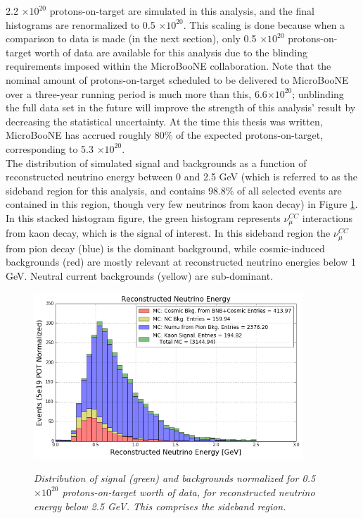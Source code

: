 2.2 $\times 10^{20}$ protons-on-target are simulated in this analysis, and the final histograms are renormalized to 0.5 $\times 10^{20}$. This scaling is done because when a comparison to data is made (in the next section), only 0.5 $\times 10^{20}$ protons-on-target worth of data are available for this analysis due to the blinding requirements imposed within the MicroBooNE collaboration. Note that the nominal amount of protons-on-target scheduled to be delivered to MicroBooNE over a three-year running period is much more than this, 6.6$\times 10^{20}$; unblinding the full data set in the future will improve the strength of this analysis' result by decreasing the statistical uncertainty. At the time this thesis was written, MicroBooNE has accrued roughly 80\% of the expected protons-on-target, corresponding to 5.3 $\times 10^{20}$.\\

The distribution of simulated signal and backgrounds as a function of reconstructed neutrino energy between 0 and 2.5 GeV (which is referred to as the sideband region for this analysis, and contains 98.8\% of all selected events are contained in this region, though very few neutrinos from kaon decay) in Figure \ref{kaon_stack_sideband_nodata}. In this stacked histogram figure, the green histogram represents $\nu_\mu^{CC}$ interactions from kaon decay, which is the signal of interest. In this sideband region the $\nu_\mu^{CC}$ from pion decay (blue) is the dominant background, while cosmic-induced backgrounds (red) are mostly relevant at reconstructed neutrino energies below 1 GeV. Neutral current backgrounds (yellow) are sub-dominant.\\

\begin{figure}[ht!]
\centering
	\includegraphics[width=0.9\textwidth]{Figures/kaon_simonly_sideband.png} \\
\caption{\textit{Distribution of signal (green) and backgrounds normalized for 0.5 $\times 10^{20}$ protons-on-target worth of data, for reconstructed neutrino energy below 2.5 GeV. This comprises the sideband region.}}\label{kaon_stack_sideband_nodata}
\end{figure}

